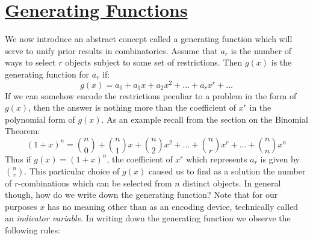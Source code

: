 \documentclass[12pt, letterpaper, onecolumn, conference, final]{IEEEtran}
\theoremstyle{definition}
\theoremstyle{plain}
\begin{document}
\section{\textbf{\underline{Generating Functions}}}
\vspace{.3cm}
\noindent
We now introduce an abstract concept called a generating function which will serve to unify prior results in combinatorics. Assume that $a_r$ is the number of ways to select $r$ objects subject to some set of restrictions. Then $g(x)$ is the generating function for $a_r$ if:
\begin{equation*}
g(x) = a_0 + a_1x + a_2x^2 + \dots + a_rx^r + \dots
\end{equation*}
If we can somehow encode the restrictions peculiar to a problem in the form of $g(x)$, then the answer is nothing more than the coefficient of $x^r$ in the polynomial form of $g(x)$. As an example recall from the section on the Binomial Theorem:
\begin{equation*}
(1+x)^n = {n \choose 0} + {n \choose 1}x + {n \choose 2}x^2 + \dots + {n \choose r}x^r + \dots + {n \choose n}x^n
\end{equation*}
Thus if $g(x) = (1+x)^n$, the coefficient of $x^r$ which represents $a_r$ is given by ${n \choose r}$. This particular choice of $g(x)$ caused us to find as a solution the number of $r$-combinations which can be selected from $n$ distinct objects. In general though, how do we write down the generating function? Note that for our purposes $x$ has no meaning other than as an encoding device, technically called an \textit{indicator variable}. In writing down the generating function we observe the following rules:
\end{document}
